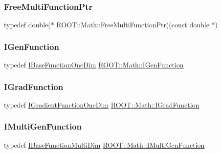 \subsubsection{\texorpdfstring{FreeMultiFunctionPtr}{FreeMultiFunctionPtr}}
{\footnotesize\ttfamily typedef double($\ast$ R\+O\+O\+T\+::\+Math\+::\+Free\+Multi\+Function\+Ptr)(const double $\ast$)}

\mbox{\label{namespaceROOT_1_1Math_afe6400b4439b79d54c41fb9f5c5af171}} 
\subsubsection{\texorpdfstring{IGenFunction}{IGenFunction}}
{\footnotesize\ttfamily typedef \mbox{\hyperlink{classROOT_1_1Math_1_1IBaseFunctionOneDim}{I\+Base\+Function\+One\+Dim}} \mbox{\hyperlink{namespaceROOT_1_1Math_afe6400b4439b79d54c41fb9f5c5af171}{R\+O\+O\+T\+::\+Math\+::\+I\+Gen\+Function}}}

\mbox{\label{namespaceROOT_1_1Math_a2ff34b4dac0c7103abd9f3053e4666af}} 
\subsubsection{\texorpdfstring{IGradFunction}{IGradFunction}}
{\footnotesize\ttfamily typedef \mbox{\hyperlink{classROOT_1_1Math_1_1IGradientFunctionOneDim}{I\+Gradient\+Function\+One\+Dim}} \mbox{\hyperlink{namespaceROOT_1_1Math_a2ff34b4dac0c7103abd9f3053e4666af}{R\+O\+O\+T\+::\+Math\+::\+I\+Grad\+Function}}}

\mbox{\label{namespaceROOT_1_1Math_aec22897f3d759f7c284893c81d980799}} 
\subsubsection{\texorpdfstring{IMultiGenFunction}{IMultiGenFunction}}
{\footnotesize\ttfamily typedef \mbox{\hyperlink{classROOT_1_1Math_1_1IBaseFunctionMultiDim}{I\+Base\+Function\+Multi\+Dim}} \mbox{\hyperlink{namespaceROOT_1_1Math_aec22897f3d759f7c284893c81d980799}{R\+O\+O\+T\+::\+Math\+::\+I\+Multi\+Gen\+Function}}}

